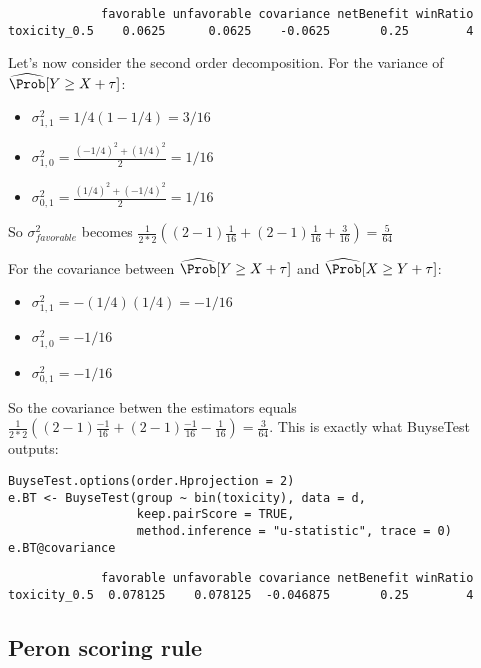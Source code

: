 \documentclass[12pt]{article}
\begin{document}
\begin{verbatim}
             favorable unfavorable covariance netBenefit winRatio
toxicity_0.5    0.0625      0.0625    -0.0625       0.25        4
\end{verbatim}

\bigskip

Let's now consider the second order decomposition. For the variance of
\(\widehat{\Prob}[Y \geq X + \tau]\):
\begin{itemize}
\item \(\sigma^{2}_{1,1}=1/4(1-1/4)=3/16\)
\item \(\sigma^{2}_{1,0}=\frac{(-1/4)^2+(1/4)^2}{2} = 1/16\)
\item \(\sigma^{2}_{0,1}=\frac{(1/4)^2+(-1/4)^2}{2}  = 1/16\)
\end{itemize}
So \(\sigma^2_{favorable}\) becomes
\(\frac{1}{2*2}\left((2-1)\frac{1}{16}+(2-1)\frac{1}{16}+\frac{3}{16}\right)=\frac{5}{64}\)

\bigskip

For the covariance between \(\widehat{\Prob}[Y \geq X + \tau]\) and
\(\widehat{\Prob}[X \geq Y + \tau]\):
\begin{itemize}
\item \(\sigma^{2}_{1,1}=- (1/4)(1/4)  = -1/16\)
\item \(\sigma^{2}_{1,0}=- 1/16\)
\item \(\sigma^{2}_{0,1}=- 1/16\)
\end{itemize}
So the covariance betwen the estimators equals
\(\frac{1}{2*2}\left((2-1)\frac{-1}{16}+(2-1)\frac{-1}{16}-\frac{1}{16}\right)=\frac{3}{64}\). This
is exactly what BuyseTest outputs:

\lstset{language=r,label= ,caption= ,captionpos=b,numbers=none}
\begin{lstlisting}
BuyseTest.options(order.Hprojection = 2)
e.BT <- BuyseTest(group ~ bin(toxicity), data = d, 
				  keep.pairScore = TRUE,
				  method.inference = "u-statistic", trace = 0)
e.BT@covariance
\end{lstlisting}

\begin{verbatim}
             favorable unfavorable covariance netBenefit winRatio
toxicity_0.5  0.078125    0.078125  -0.046875       0.25        4
\end{verbatim}



\clearpage

\subsection{Peron scoring rule}
\label{sec:orgb6e9f70}
\end{document}
